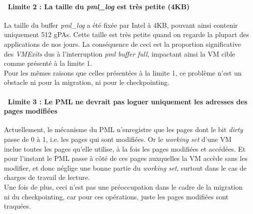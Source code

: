 \paragraph{\textbullet\ \textbf{Limite 2 : La taille du \textit{pml\_log} est très petite (4KB)}}
\par\noindent
\par\noindent La taille du buffer \textit{pml\_log} a été fixée par Intel à 4KB, pouvant ainsi contenir uniquement 512 gPAs. Cette taille est très petite quand on regarde la plupart des applications de nos jours. La conséquence de ceci est la proportion significative des \textit{VMExits} dus à l'interruption \textit{pml buffer full}, impactant ainsi la VM cible comme présenté à la limite 1.\\
Pour les mêmes raisons que celles présentées à la limite 1, ce problème n'est un obstacle ni pour la migration, ni pour le checkpointing.

\paragraph{\textbullet\ \textbf{Limite 3 : Le PML ne devrait pas loguer uniquement les adresses des pages modifiées}}
\par\noindent
\par\noindent Actuellement, le mécanisme du PML n'enregistre que les pages dont le bit \textit{dirty} passe de 0 à 1, i.e. les pages qui sont modifiées. Or le \textit{working set} d'une VM inclue toutes les pages qu'elle utilise, à la fois les pages modifiées et accédées. Et pour l'instant le PML passe à côté de ces pages auxquelles la VM accède sans les modifier, et donc néglige une bonne partie du \textit{working set}, surtout dans le cas de charges de travail de lecture.\\
Une fois de plus, ceci n'est pas une préoccupation dans le cadre de la migration ni du checkpointing, car pour ces opérations, juste les pages modifiées sont traquées.

